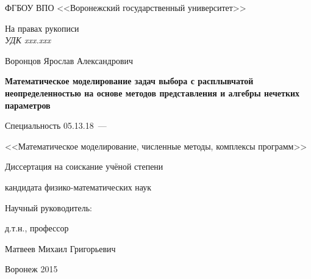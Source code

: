 \thispagestyle{empty}

\begin{center}
ФГБОУ ВПО <<Воронежский государственный университет>>\par
\par 
\par
\end{center}

\vspace{10mm}
\begin{flushright}
На правах рукописи \\
{\sl УДК xxx.xxx\/}
\end{flushright}

\vspace{10mm}
\begin{center}
{\large Воронцов Ярослав Александрович}
\end{center}

\vspace{5mm}
\begin{center}
{\bf \large Математическое моделирование задач выбора с расплывчатой неопределенностью на основе методов представления и алгебры нечетких параметров
\par}

\vspace{10mm}
{%
Специальность 05.13.18~---

<<Математическое моделирование, численные методы, комплексы программ>>
}

\vspace{10mm}
Диссертация на соискание учёной степени

кандидата физико-математических наук
\end{center}

\vspace{15mm}
\begin{flushright}
Научный руководитель:

д.т.н., профессор

Матвеев Михаил Григорьевич

\end{flushright}

\vspace{20mm}
\begin{center}
{Воронеж 2015}
\end{center}

\newpage